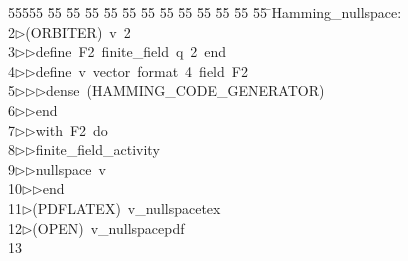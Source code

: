 %
%
\begin{tabbing}
55555 \= 55 \= 55 \= 55 \= 55 \= 55 \= 55 \= 55 \= 55 \= 55 \= 55 \= 55 \= 55 \= \>Hamming\_nullspace:\\[0pt]
2\>$\triangleright$\>(ORBITER)\ v\ 2\ \\[0pt]
3\>$\triangleright$\>$\triangleright$\>define\ F2\ finite\_field\ q\ 2\ end\ \\[0pt]
4\>$\triangleright$\>$\triangleright$\>define\ v\ vector\ format\ 4\ field\ F2\ \\[0pt]
5\>$\triangleright$\>$\triangleright$\>$\triangleright$\>dense\ (HAMMING\_CODE\_GENERATOR)\ \\[0pt]
6\>$\triangleright$\>$\triangleright$\>end\ \\[0pt]
7\>$\triangleright$\>$\triangleright$\>with\ F2\ do\ \\[0pt]
8\>$\triangleright$\>$\triangleright$\>finite\_field\_activity\ \\[0pt]
9\>$\triangleright$\>$\triangleright$\>nullspace\ v\ \\[0pt]
10\>$\triangleright$\>$\triangleright$\>end\\[0pt]
11\>$\triangleright$\>(PDFLATEX)\ v\_nullspacetex\\[0pt]
12\>$\triangleright$\>(OPEN)\ v\_nullspacepdf\\[0pt]
13\>\end{tabbing}
